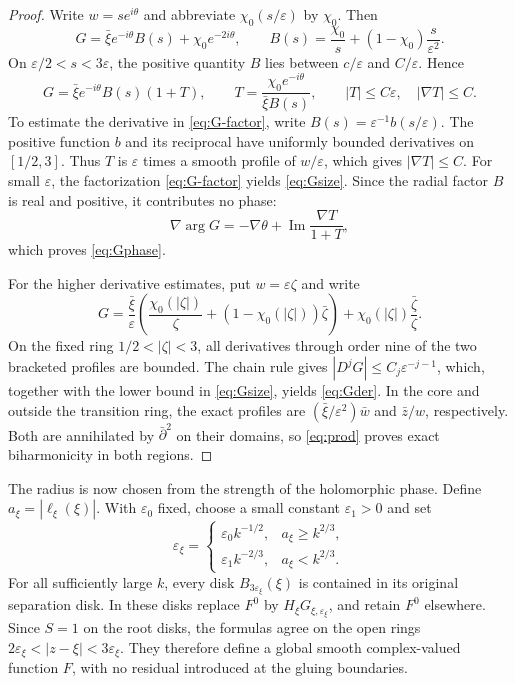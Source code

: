 \documentclass[11pt,a4paper,leqno]{amsart}
\numberwithin{equation}{section}
\theoremstyle{landisplain}
\theoremstyle{landisdefinition}
\theoremstyle{landisremark}
\newcommand{\pb}{\bar\partial}
\newcommand{\eps}{\varepsilon}
\newcommand{\Ima}{\operatorname{Im}}
\begin{document}
\begin{proof}
Write $w=se^{i\theta}$ and abbreviate $\chi_0(s/\eps)$ by $\chi_0$.
Then
\[
 G=\bar\xi e^{-i\theta}B(s)+\chi_0e^{-2i\theta},\qquad
 B(s)=\frac{\chi_0}{s}+(1-\chi_0)\frac{s}{\eps^2}.
\]
On $\eps/2<s<3\eps$, the positive quantity $B$ lies between
$c/\eps$ and $C/\eps$. Hence
\begin{equation}\label{eq:G-factor}
 G=\bar\xi e^{-i\theta}B(s)(1+T),\qquad
 T=\frac{\chi_0e^{-i\theta}}{\bar\xi B(s)},
 \qquad |T|\le C\eps,\quad |\nabla T|\le C.
\end{equation}
To estimate the derivative in \eqref{eq:G-factor}, write
$B(s)=\eps^{-1}b(s/\eps)$. The positive function $b$ and its
reciprocal have uniformly bounded derivatives on $[1/2,3]$.
Thus $T$ is $\eps$ times a smooth profile of $w/\eps$, which
gives $|\nabla T|\le C$. For small $\eps$, the factorization
\eqref{eq:G-factor} yields \eqref{eq:Gsize}. Since the radial
factor $B$ is real and positive, it contributes no phase:
\[
 \nabla\arg G=-\nabla\theta+
                  \Ima\frac{\nabla T}{1+T},
\]
which proves \eqref{eq:Gphase}.

For the higher derivative estimates, put $w=\eps\zeta$ and write
\[
 G=\frac{\bar\xi}{\eps}
       \left(\frac{\chi_0(|\zeta|)}{\zeta}
                         +(1-\chi_0(|\zeta|))\bar\zeta\right)
       +\chi_0(|\zeta|)\frac{\bar\zeta}{\zeta}.
\]
On the fixed ring $1/2<|\zeta|<3$, all derivatives through order nine
of the two bracketed profiles are bounded. The chain rule gives
$|D^jG|\le C_j\eps^{-j-1}$, which, together with the lower bound in
\eqref{eq:Gsize}, yields \eqref{eq:Gder}.
In the core and outside the transition ring, the exact profiles
are $(\bar\xi/\eps^2)\bar w$ and $\bar z/w$, respectively.
Both are annihilated by $\pb^2$ on their domains, so
\eqref{eq:prod} proves exact biharmonicity in both regions.
\end{proof}

The radius is now chosen from the strength of the holomorphic
phase. Define $a_\xi=|\ell_\xi(\xi)|$. With $\eps_0$ fixed,
choose a small constant $\eps_1>0$ and set
\begin{equation}\label{eq:adaptive}
 \eps_\xi=
 \begin{cases}
 \eps_0k^{-1/2},&a_\xi\ge k^{2/3},\\
 \eps_1k^{-2/3},&a_\xi<k^{2/3}.
 \end{cases}
\end{equation}
For all sufficiently large $k$, every disk $B_{3\eps_\xi}(\xi)$ is
contained in its original separation disk. In these disks replace
$F^0$ by $H_\xi G_{\xi,\eps_\xi}$, and retain $F^0$ elsewhere.
Since $S=1$ on the root disks, the formulas agree on the open
rings $2\eps_\xi<|z-\xi|<3\eps_\xi$. They therefore define
a global smooth complex-valued function $F$, with no residual
introduced at the gluing boundaries.
\end{document}
